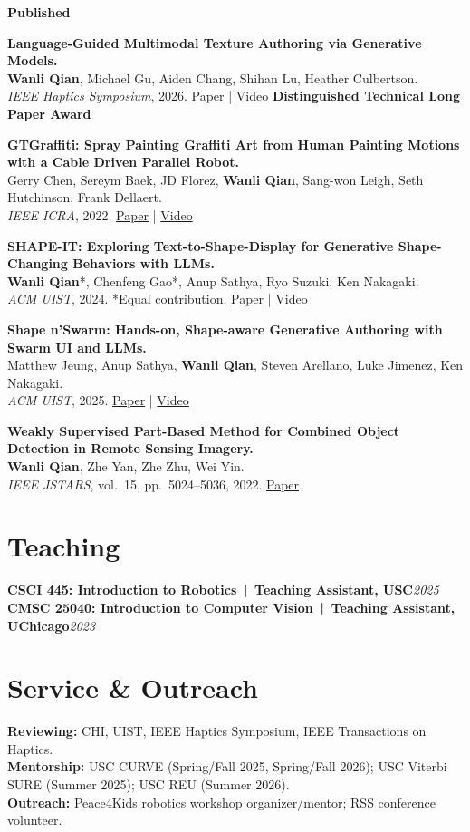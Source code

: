 \documentclass[10pt,letterpaper]{article}
\newcommand{\entry}[2]{\textbf{#1}\hfill\textit{#2}\\}
\newcommand{\pub}[3]{\begin{minipage}[t]{\linewidth}#1\\[-1pt]#2\\[-1pt]#3\end{minipage}\par\vspace{5pt}}
\newcommand{\me}{\textbf{Wanli Qian}}
\begin{document}
{\color{navy}\textbf{Published}}\par\vspace{3pt}
\pub{\textbf{Language-Guided Multimodal Texture Authoring via Generative Models.}}
    {\me, Michael Gu, Aiden Chang, Shihan Lu, Heather Culbertson.}
    {\textit{IEEE Haptics Symposium}, 2026. \href{https://arxiv.org/abs/2604.06489}{Paper} | \href{https://youtu.be/f5vz52uPw-4}{Video} \enspace\textbf{Distinguished Technical Long Paper Award}}
\pub{\textbf{GTGraffiti: Spray Painting Graffiti Art from Human Painting Motions with a Cable Driven Parallel Robot.}}
    {Gerry Chen, Sereym Baek, JD Florez, \me, Sang-won Leigh, Seth Hutchinson, Frank Dellaert.}
    {\textit{IEEE ICRA}, 2022. \href{https://ieeexplore.ieee.org/document/9812008}{Paper} | \href{https://www.youtube.com/watch?v=R4ySYTNGv6s}{Video}}
\pub{\textbf{SHAPE-IT: Exploring Text-to-Shape-Display for Generative Shape-Changing Behaviors with LLMs.}}
    {\me*, Chenfeng Gao*, Anup Sathya, Ryo Suzuki, Ken Nakagaki.}
    {\textit{ACM UIST}, 2024. *Equal contribution. \href{https://dl.acm.org/doi/10.1145/3654777.3676348}{Paper} | \href{https://www.youtube.com/watch?v=2NxzOBc7AdQ}{Video}}
\pub{\textbf{Shape n'Swarm: Hands-on, Shape-aware Generative Authoring with Swarm UI and LLMs.}}
    {Matthew Jeung, Anup Sathya, \me, Steven Arellano, Luke Jimenez, Ken Nakagaki.}
    {\textit{ACM UIST}, 2025. \href{https://dl.acm.org/doi/10.1145/3746059.3747781}{Paper} | \href{https://www.youtube.com/watch?v=5u0M9yL7tyY}{Video}}
\pub{\textbf{Weakly Supervised Part-Based Method for Combined Object Detection in Remote Sensing Imagery.}}
    {\me, Zhe Yan, Zhe Zhu, Wei Yin.}
    {\textit{IEEE JSTARS}, vol.\ 15, pp.\ 5024--5036, 2022. \href{https://ieeexplore.ieee.org/document/9789416}{Paper}}

\section{Teaching}
\entry{CSCI 445: Introduction to Robotics \,|\, Teaching Assistant, USC}{2025}
\entry{CMSC 25040: Introduction to Computer Vision \,|\, Teaching Assistant, UChicago}{2023}

\section{Service \& Outreach}
\textbf{Reviewing:} CHI, UIST, IEEE Haptics Symposium, IEEE Transactions on Haptics.\\
\textbf{Mentorship:} USC CURVE (Spring/Fall 2025, Spring/Fall 2026); USC Viterbi SURE (Summer 2025); USC REU (Summer 2026).\\
\textbf{Outreach:} Peace4Kids robotics workshop organizer/mentor; RSS conference volunteer.
\end{document}
